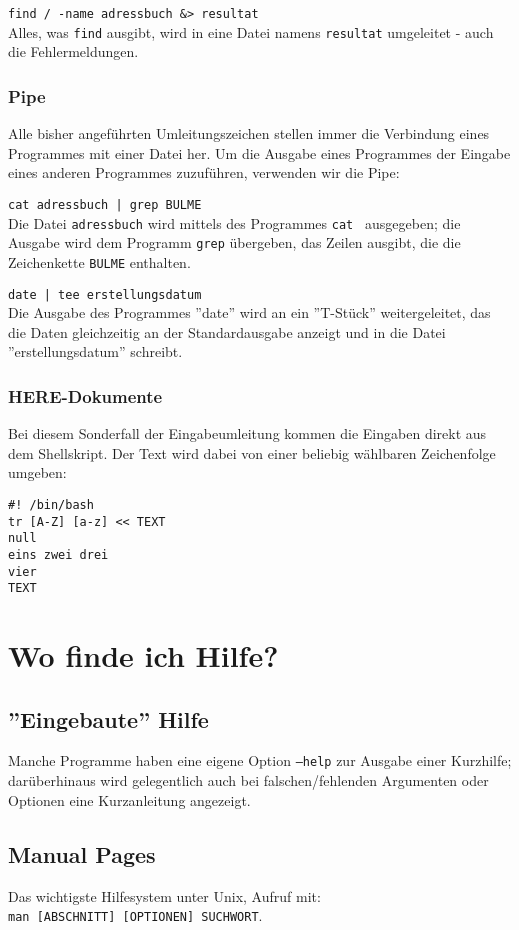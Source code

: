 \documentclass[11pt]{article}
\begin{document}
\texttt{find / -name adressbuch \&> resultat} \\ 
Alles, was \texttt{find} ausgibt, wird in eine Datei namens
\texttt{resultat} umgeleitet - auch die Fehlermeldungen.

\subsubsection{Pipe}
Alle bisher angeführten Umleitungszeichen stellen immer die Verbindung
eines Programmes mit einer Datei her. Um die Ausgabe eines Programmes
der Eingabe eines anderen Programmes zuzuführen, verwenden wir die
Pipe:

\texttt{cat adressbuch | grep BULME} \\
Die Datei \texttt{adressbuch} wird mittels des Programmes \texttt{cat
} ausgegeben; die Ausgabe wird dem Programm \texttt{grep} übergeben, das
Zeilen ausgibt, die die Zeichenkette \texttt{BULME} enthalten.

\texttt{date | tee erstellungsdatum} \\
Die Ausgabe des Programmes ''date'' wird an ein ''T-Stück''
weitergeleitet, das die Daten gleichzeitig an der Standardausgabe
anzeigt und in die Datei ''erstellungsdatum'' schreibt.
 
\subsubsection{HERE-Dokumente}
Bei diesem Sonderfall der Eingabeumleitung kommen die Eingaben direkt
aus dem Shellskript. Der Text wird dabei von einer beliebig wählbaren
Zeichenfolge umgeben:
\begin{verbatim}
#! /bin/bash
tr [A-Z] [a-z] << TEXT
null
eins zwei drei
vier 
TEXT
\end{verbatim}

\section{Wo finde ich Hilfe?}
\subsection{''Eingebaute'' Hilfe}
Manche Programme haben eine eigene Option \texttt{--help} zur Ausgabe
einer Kurzhilfe; darüberhinaus wird gelegentlich auch bei
falschen/fehlenden Argumenten oder Optionen eine Kurzanleitung
angezeigt.

\subsection{Manual Pages}
Das wichtigste Hilfesystem unter Unix, Aufruf mit: \\
 \texttt{man [ABSCHNITT] [OPTIONEN] SUCHWORT}.\\
\end{document}
